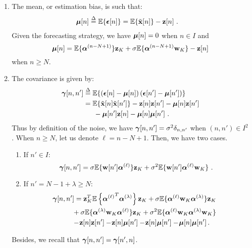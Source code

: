 \begin{enumerate}
\item 
The mean, or estimation bias, is such that: 
\begin{align}
\bmu[n]&\defeq\EE\{\bepsilon[n]\} 
=\EE\{\tilde\bx[n]\} - \bz[n]\ .\label{eq:defn:bias0}
\end{align}
Given the forecasting strategy, we have $\boldsymbol{\mu}[n]=0$ when $n\in I$ and
\begin{equation}
\bmu[n]= \EE\{\balpha^{(n-N+1)}\}\bz_{K} + \sigma\EE\{\balpha^{(n-N+1)}\bw_{K}\} - \bz[n]
\label{eq:bias0}
\end{equation}
when $n\geq N$.
\item 
The covariance is given by:
\begin{align*}
\boldsymbol{\gamma}[n,n'] &\overset{\Delta}{=} {\mathbb E}\{\left(\boldsymbol{\epsilon}[n]-\boldsymbol{\mu}[n]\right)\left(\boldsymbol{\epsilon}[n']-\boldsymbol{\mu}[n']\right)\}\\
&= {\mathbb E}\{\tilde{{\mathbf x}}[n]\tilde{{\mathbf x}}[n']\}-{\mathbf z}[n]{\mathbf z}[n'] -\boldsymbol{\mu}[n]{\mathbf z}[n'] \\
&\hspace{15pt} - \boldsymbol{\mu}[n']{\mathbf z}[n] -\boldsymbol{\mu}[n]\boldsymbol{\mu}[n']\ .
\end{align*}
Thus by definition of the noise, we have $\boldsymbol{\gamma}[n,n'] =\sigma^2\delta_{n,n'}$ when $(n,n')\in I^2$. When $n\geq N$, let us denote $\ell=n-N+1$. Then, we have two cases.
\begin{enumerate}[label=(\roman*)]
\item If $n'\in I$:
\begin{equation}
\bgamma[n,n'] = \sigma\EE\{\bw[n']\balpha^{(\ell)}\}\bz_K + \sigma^2\EE\{\bw[n']\balpha^{(\ell)}\bw_K\}\ .
\label{eq:cov00}
\end{equation}
\item If $n'=N-1+\lambda\geq N$:
\begin{align}
\nonumber
\hspace{-6pt}\bgamma[n,n'] &= \bz_K^T\EE\left\{{\balpha^{(\ell)}}^T\balpha^{(\lambda)}\right\}\bz_K + \sigma\EE\{\balpha^{(\ell)}\bw_K\balpha^{(\lambda)}\}\bz_K \\
\nonumber
&\hspace{-3pt} + \sigma\EE\{\balpha^{(\lambda)}\bw_K\balpha^{(\ell)}\}\bz_K + \sigma^2\EE\{\balpha^{(\ell)}\bw_K\balpha^{(\lambda)}\bw_K\}  \\
&\hspace{-3pt} -\!\bz[n]\bz[n']-\!\bz[n]\bmu[n']-\!\bz[n]\bmu[n'] -\! \bmu[n]\bmu[n']\,.
\label{eq:cov01}
\end{align}
\end{enumerate}
Besides, we recall that $\boldsymbol{\gamma}[n,n']=\boldsymbol{\gamma}[n',n]$.
\end{enumerate}

